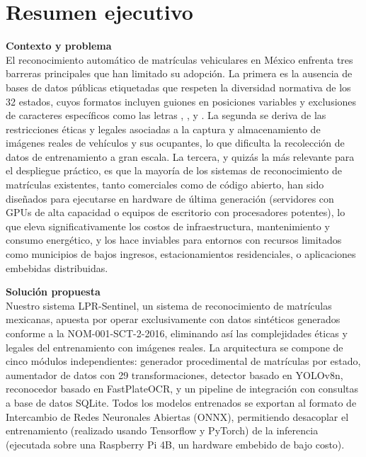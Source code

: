\section*{Resumen ejecutivo}

{\sffamily{}\color{MASA-Blue} \textbf{Contexto y problema}}\\
El reconocimiento automático de matrículas vehiculares en México enfrenta tres barreras principales que han limitado su adopción. La primera es la ausencia de bases de datos públicas etiquetadas que respeten la diversidad normativa de los 32 estados, cuyos formatos incluyen guiones en posiciones variables y exclusiones de caracteres específicos como las letras , ,  y . La segunda se deriva de las restricciones éticas y legales asociadas a la captura y almacenamiento de imágenes reales de vehículos y sus ocupantes, lo que dificulta la recolección de datos de entrenamiento a gran escala. La tercera, y quizás la más relevante para el despliegue práctico, es que la mayoría de los sistemas de reconocimiento de matrículas existentes, tanto comerciales como de código abierto, han sido diseñados para ejecutarse en hardware de última generación (servidores con GPUs de alta capacidad o equipos de escritorio con procesadores potentes), lo que eleva significativamente los costos de infraestructura, mantenimiento y consumo energético, y los hace inviables para entornos con recursos limitados como municipios de bajos ingresos, estacionamientos residenciales, o aplicaciones embebidas distribuidas.

{\sffamily{}\color{MASA-Blue} \textbf{Solución propuesta}}\\
Nuestro sistema LPR-Sentinel, un sistema de reconocimiento de matrículas mexicanas, apuesta por operar exclusivamente con datos sintéticos generados conforme a la NOM-001-SCT-2-2016, eliminando así las complejidades éticas y legales del entrenamiento con imágenes reales. La arquitectura se compone de cinco módulos independientes: generador procedimental de matrículas por estado, aumentador de datos con 29 transformaciones, detector basado en YOLOv8n, reconocedor basado en FastPlateOCR, y un pipeline de integración con consultas a base de datos SQLite. Todos los modelos entrenados se exportan al formato de Intercambio de Redes Neuronales Abiertas (ONNX), permitiendo desacoplar el entrenamiento (realizado usando Tensorflow y PyTorch) de la inferencia (ejecutada sobre una Raspberry Pi 4B, un hardware embebido de bajo costo).

